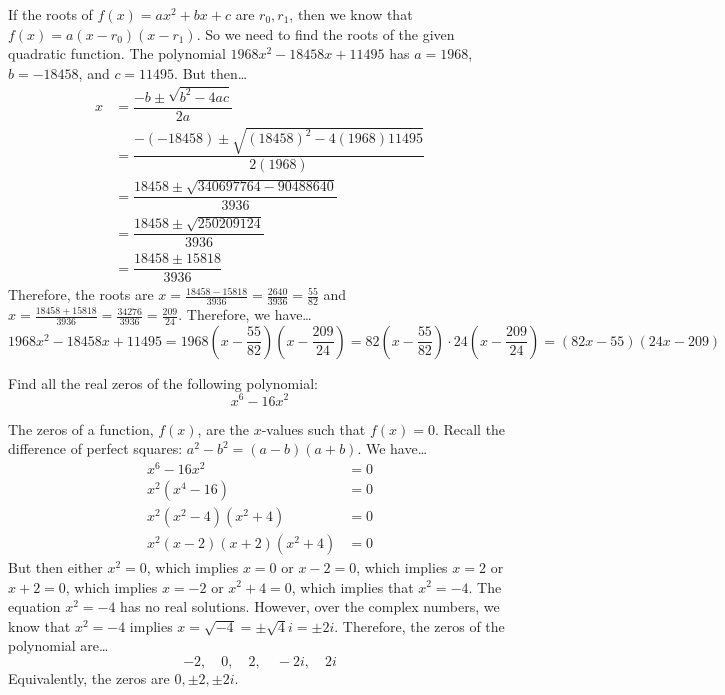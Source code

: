 \documentclass[11pt,letterpaper]{article}
\begin{document}
\sol If the roots of $f(x)= ax^2 + bx + c$ are $r_0, r_1$, then we know that $f(x)= a(x - r_0)(x - r_1)$. So we need to find the roots of the given quadratic function. The polynomial $1968x^2 - 18458x + 11495$ has $a= 1968$, $b= -18458$, and $c= 11495$. But then\dots
	\[
	\begin{aligned}
	x&= \dfrac{-b \pm \sqrt{b^2 - 4ac}}{2a} \\[0.3cm]
	&= \dfrac{-(-18458) \pm \sqrt{(18458)^2 - 4(1968)11495}}{2(1968)} \\[0.3cm]
	&= \dfrac{18458 \pm \sqrt{340697764 - 90488640}}{3936} \\[0.3cm]
	&= \dfrac{18458 \pm \sqrt{250209124}}{3936} \\[0.3cm]
	&= \dfrac{18458 \pm 15818}{3936}
	\end{aligned}
	\] \pspace
Therefore, the roots are $x= \frac{18458 - 15818}{3936}= \frac{2640}{3936}= \frac{55}{82}$ and $x= \frac{18458 + 15818}{3936}= \frac{34276}{3936}= \frac{209}{24}$. Therefore, we have\dots
	\[
	1968x^2 - 18458x + 11495= 1968 \left(x - \dfrac{55}{82} \right) \left(x - \dfrac{209}{24} \right)= 82 \left(x - \dfrac{55}{82} \right) \cdot 24 \left(x - \dfrac{209}{24} \right)= (82x - 55)(24x - 209)
	\]



\newpage



 Find all the real zeros of the following polynomial:
	\[
	x^6 - 16x^2
	\] \pspace

\sol The zeros of a function, $f(x)$, are the $x$-values such that $f(x)= 0$. Recall the difference of perfect squares: $a^2 - b^2= (a - b)(a + b)$. We have\dots
	\[
	\begin{aligned}
	x^6 - 16x^2&= 0 \\[0.3cm]
	x^2(x^4 - 16)&= 0  \\[0.3cm]
	x^2(x^2 - 4)(x^2 + 4)&= 0  \\[0.3cm]
	x^2(x - 2)(x + 2)(x^2 + 4)&= 0 
	\end{aligned}
	\]
But then either $x^2= 0$, which implies $x= 0$ or $x - 2= 0$, which implies $x= 2$ or $x + 2= 0$, which implies $x= -2$ or $x^2 + 4= 0$, which implies that $x^2= -4$. The equation $x^2= -4$ has no real solutions. However, over the complex numbers, we know that $x^2= -4$ implies $x= \sqrt{-4}= \pm \sqrt{4} i= \pm 2i$. Therefore, the zeros of the polynomial are\dots
	\[
	-2, \quad 0, \quad 2, \quad -2i, \quad 2i 
	\]
Equivalently, the zeros are $0, \pm 2, \pm 2i$. 
\end{document}
